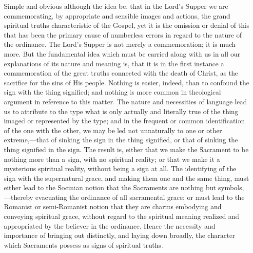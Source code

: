 \documentclass[]{book}
\begin{document}
Simple and obvious although the idea be, that in the Lord's Supper we are commemorating, by appropriate and sensible images and actions, the grand spiritual truths characteristic of the Gospel, yet it is the omission or denial of this that has been the primary cause of numberless errors in regard to the nature of the ordinance. The Lord's Supper is not merely a commemoration; it is much more. But the fundamental idea which must be carried along with us in all our explanations of its nature and meaning is, that it is in the first instance a commemoration of the great truths connected with the death of Christ, as the sacrifice for the sins of His people. Nothing is easier, indeed, than to confound the sign with the thing signified; and nothing is more common in theological argument in reference to this matter. The nature and necessities of language lead us to attribute to the type what is only actually and literally true of the thing imaged or represented by the type; and in the frequent or common identification of the one with the other, we may be led not unnaturally to one or other extreme,---that of sinking the sign in the thing signified, or that of sinking the thing signified in the sign. The result is, either that we make the Sacrament to be nothing more than a sign, with no spiritual reality; or that we make it a mysterious spiritual reality, without being a sign at all. The identifying of the sign with the supernatural grace, and making them one and the same thing, must either lead to the Socinian notion that the Sacraments are nothing but symbols,---thereby evacuating the ordinance of all sacramental grace; or must lead to the Romanist or semi-Romanist notion that they are charms embodying and conveying spiritual grace, without regard to the spiritual meaning realized and appropriated by the believer in the ordinance. Hence the necessity and importance of bringing out distinctly, and laying down broadly, the character which Sacraments possess as signs of spiritual truths.
\end{document}

